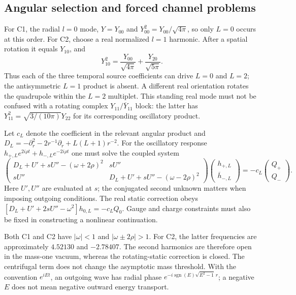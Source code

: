 \subsection{Angular selection and forced channel problems}
\label{nl:selection}
For C1, the radial $l=0$ mode, $Y=Y_{00}$ and
$Y_{00}^2=Y_{00}/\sqrt{4\pi}$, so only $L=0$ occurs at this order.
For C2, choose a real normalized $l=1$ harmonic. After a spatial rotation
it equals $Y_{10}$, and
\begin{equation}
 Y_{10}^2=\frac{Y_{00}}{\sqrt{4\pi}}
          +\frac{Y_{20}}{\sqrt{5\pi}}.
 \label{nl:angular}
\end{equation}
Thus each of the three temporal source coefficients can drive $L=0$
and $L=2$; the antisymmetric $L=1$ product is absent. A different real
orientation rotates the quadrupole within the $L=2$ multiplet. This
standing real mode must not be confused with a rotating complex
$Y_{11}/\overline{Y}_{11}$ block: the latter has
$Y_{11}^2=\sqrt{3/(10\pi)}Y_{22}$ for its corresponding oscillatory product.

Let $c_L$ denote the coefficient in the relevant angular product and
$D_L=-\partial_r^2-2r^{-1}\partial_r+L(L+1)r^{-2}$. For the oscillatory
response $h_{+,L}e^{2i\rho t}+h_{-,L}e^{-2i\rho t}$ one must solve
the coupled system
\begin{equation}
 \begin{pmatrix}
 D_L+U'+sU''-(\omega+2\rho)^2&sU''\\
 sU''&D_L+U'+sU''-(\omega-2\rho)^2
 \end{pmatrix}
 \begin{pmatrix}h_{+,L}\\\overline{h}_{-,L}\end{pmatrix}
 =-c_L\begin{pmatrix}Q_+\\Q_-\end{pmatrix}.
 \label{nl:forced}
\end{equation}
Here $U',U''$ are evaluated at $s$; the conjugated second unknown matters
when imposing outgoing conditions. The real static correction obeys
$[D_L+U'+2sU''-\omega^2]h_{0,L}=-c_LQ_0$.
Gauge and charge constraints must also be fixed in constructing a
nonlinear continuation.

Both C1 and C2 have $|\omega|<1$ and $|\omega\pm2\rho|>1$.
For C2, the latter frequencies are approximately $4.52130$ and $-2.78407$.
The second harmonics are therefore open in the mass-one vacuum, whereas
the rotating-static correction is closed. The centrifugal term does
not change the asymptotic mass threshold. With the convention
$e^{iEt}$, an outgoing wave has radial phase
$e^{-i\operatorname{sgn}(E)\sqrt{E^2-1}\,r}$; a negative $E$ does not
mean negative outward energy transport.

